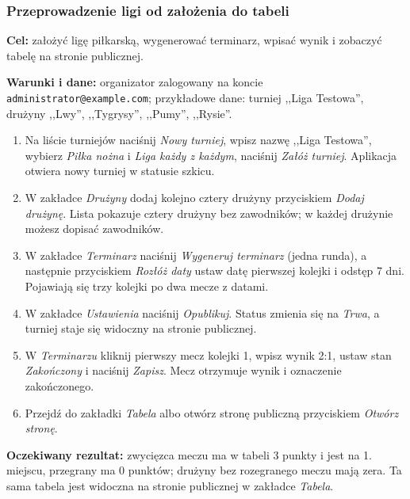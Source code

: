 \documentclass[11pt,a4paper,oneside]{article}
\begin{document}
\subsubsection{Przeprowadzenie ligi od założenia do tabeli}
\textbf{Cel:} założyć ligę piłkarską, wygenerować terminarz, wpisać wynik i zobaczyć tabelę na stronie publicznej.\par
\textbf{Warunki i dane:} organizator zalogowany na koncie \texttt{administrator@example.com}; przykładowe dane: turniej ,,Liga Testowa'', drużyny ,,Lwy'', ,,Tygrysy'', ,,Pumy'', ,,Rysie''.
\begin{enumerate}
\item Na liście turniejów naciśnij \emph{Nowy turniej}, wpisz nazwę ,,Liga Testowa'', wybierz \emph{Piłka nożna} i \emph{Liga każdy z każdym}, naciśnij \emph{Załóż turniej}. Aplikacja otwiera nowy turniej w statusie szkicu.
\item W zakładce \emph{Drużyny} dodaj kolejno cztery drużyny przyciskiem \emph{Dodaj drużynę}. Lista pokazuje cztery drużyny bez zawodników; w każdej drużynie możesz dopisać zawodników.
\item W zakładce \emph{Terminarz} naciśnij \emph{Wygeneruj terminarz} (jedna runda), a następnie przyciskiem \emph{Rozłóż daty} ustaw datę pierwszej kolejki i odstęp 7 dni. Pojawiają się trzy kolejki po dwa mecze z datami.
\item W zakładce \emph{Ustawienia} naciśnij \emph{Opublikuj}. Status zmienia się na \emph{Trwa}, a turniej staje się widoczny na stronie publicznej.
\item W \emph{Terminarzu} kliknij pierwszy mecz kolejki 1, wpisz wynik 2:1, ustaw stan \emph{Zakończony} i naciśnij \emph{Zapisz}. Mecz otrzymuje wynik i oznaczenie zakończonego.
\item Przejdź do zakładki \emph{Tabela} albo otwórz stronę publiczną przyciskiem \emph{Otwórz stronę}.
\end{enumerate}
\textbf{Oczekiwany rezultat:} zwycięzca meczu ma w tabeli 3 punkty i jest na 1. miejscu, przegrany ma 0 punktów; drużyny bez rozegranego meczu mają zera. Ta sama tabela jest widoczna na stronie publicznej w zakładce \emph{Tabela}.
\end{document}
